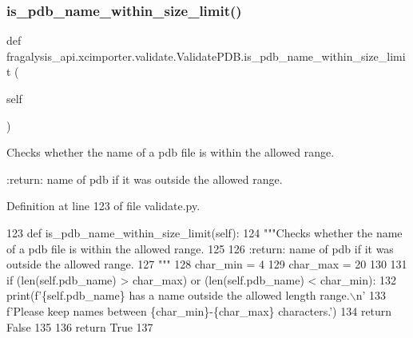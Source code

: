 \subsubsection{\texorpdfstring{is\+\_\+pdb\+\_\+name\+\_\+within\+\_\+size\+\_\+limit()}{is\_pdb\_name\_within\_size\_limit()}}
{\footnotesize\ttfamily def fragalysis\+\_\+api.\+xcimporter.\+validate.\+Validate\+P\+D\+B.\+is\+\_\+pdb\+\_\+name\+\_\+within\+\_\+size\+\_\+limit (\begin{DoxyParamCaption}\item[{}]{self }\end{DoxyParamCaption})}

\begin{DoxyVerb}Checks whether the name of a pdb file is within the allowed range.

:return: name of pdb if it was outside the allowed range.
\end{DoxyVerb}
 

Definition at line 123 of file validate.\+py.


\begin{DoxyCode}
123     \textcolor{keyword}{def }is\_pdb\_name\_within\_size\_limit(self):
124         \textcolor{stringliteral}{"""Checks whether the name of a pdb file is within the allowed range.}
125 \textcolor{stringliteral}{}
126 \textcolor{stringliteral}{        :return: name of pdb if it was outside the allowed range.}
127 \textcolor{stringliteral}{        """}
128         char\_min = 4
129         char\_max = 20
130 
131         \textcolor{keywordflow}{if} (len(self.pdb\_name) > char\_max) \textcolor{keywordflow}{or} (len(self.pdb\_name) < char\_min):
132             print(f\textcolor{stringliteral}{'\{self.pdb\_name\} has a name outside the allowed length range.\(\backslash\)n'}
133                   f\textcolor{stringliteral}{'Please keep names between \{char\_min\}-\{char\_max\} characters.'})
134             \textcolor{keywordflow}{return} \textcolor{keyword}{False}
135 
136         \textcolor{keywordflow}{return} \textcolor{keyword}{True}
137 \end{DoxyCode}
\mbox{\label{classfragalysis__api_1_1xcimporter_1_1validate_1_1_validate_p_d_b_a7e6b2f1b0ea513e4485fabb411c5f3f5}} 
